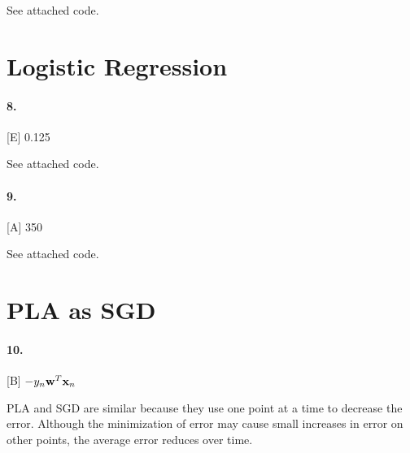\documentclass[10pt,letter]{article}
\begin{document}
	See attached code. 

\section*{Logistic Regression}

\paragraph{8.} [E] 0.125

	See attached code. 

\paragraph{9.} [A] 350

	See attached code. 

\section*{PLA as SGD}

\paragraph{10.} [B] $-y_n \textbf w^{T} \textbf x_n$

	PLA and SGD are similar because they use one point at a time to decrease the error. Although the minimization of error may cause small increases in error on other points, the average error reduces over time.
\end{document}
